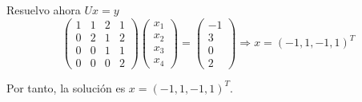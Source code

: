 \begin{ejercicio}
    Resuelvo ahora $Ux=y$
    \begin{equation*}
        \left( \begin{array}{cccc}
        1 & 1 & 2 & 1 \\
        0 & 2 & 1 & 2 \\
        0 & 0 & 1 & 1 \\
        0 & 0 & 0 & 2
    \end{array} \right)
    \left( \begin{array}{c}
        x_1 \\ x_2 \\ x_3 \\x_4
    \end{array} \right) =
    \left( \begin{array}{c}
        -1 \\ 3 \\ 0 \\2
    \end{array} \right) \Longrightarrow x = (-1,1,-1,1)^T
    \end{equation*}

    Por tanto, la solución es $x = (-1,1,-1,1)^T$.
\end{ejercicio}

